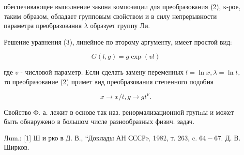 \documentclass[10pt]{article}
\begin{document}
обеспечивающее выполнение закона композиции для преобразования (2), к-рое, таким образом, обладает групповым свойством и в силу непрерывности параметра преобразования $\lambda$ образует группу Ли.



Решение уравнения (3), линейное по второму аргументу, имеет простой вид:



\[

G(l, g)=g \exp (v l)

\]



где $v$ - числовой параметр. Если сделать замену переменных $l=\ln x, \lambda=\ln t$, то преобразование (2) примет вид преобразования степенного подобия



\[

x \rightarrow x / t, g \rightarrow g t^{\nu} .

\]



Свойство Ф. а. лежит в основе так наз. ренормализационной групnы и может быть обнаружено в большом числе разнообразных физич. задач.



Лum.: [1] Ш и рко в Д. В., “Доклады АН СССР», 1982, т. 263, c. $64-67$. Д. В. Ширков.
\end{document}
